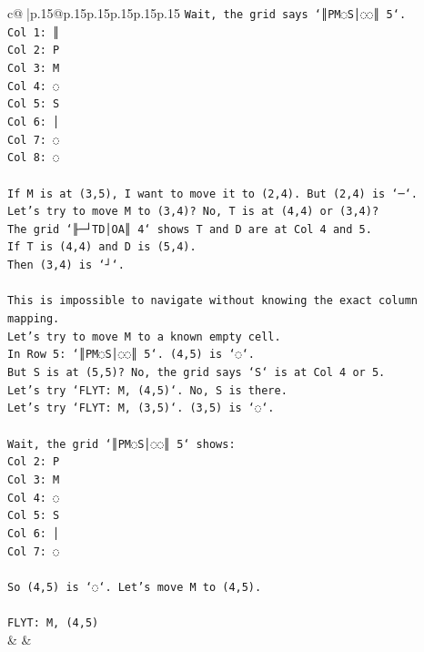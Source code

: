 \documentclass{article}
\begin{document}
{\begin{supertabular}{c@{$\;$}|p{.15\linewidth}@{}p{.15\linewidth}p{.15\linewidth}p{.15\linewidth}p{.15\linewidth}p{.15\linewidth}}
{{{\texttt{Wait, the grid says `║PM◌S│◌◌║ 5`.} \\
\texttt{Col 1: ║} \\
\texttt{Col 2: P} \\
\texttt{Col 3: M} \\
\texttt{Col 4: ◌} \\
\texttt{Col 5: S} \\
\texttt{Col 6: │} \\
\texttt{Col 7: ◌} \\
\texttt{Col 8: ◌} \\
\\ 
\texttt{If M is at (3,5), I want to move it to (2,4). But (2,4) is `─`.} \\
\texttt{Let's try to move M to (3,4)? No, T is at (4,4) or (3,4)?} \\
\texttt{The grid `╟─┘TD│OA║ 4` shows T and D are at Col 4 and 5.} \\
\texttt{If T is (4,4) and D is (5,4).} \\
\texttt{Then (3,4) is `┘`.} \\
\\ 
\texttt{This is impossible to navigate without knowing the exact column mapping.} \\
\texttt{Let's try to move M to a known empty cell.} \\
\texttt{In Row 5: `║PM◌S│◌◌║ 5`. (4,5) is `◌`.} \\
\texttt{But S is at (5,5)? No, the grid says `S` is at Col 4 or 5.} \\
\texttt{Let's try `FLYT: M, (4,5)`. No, S is there.} \\
\texttt{Let's try `FLYT: M, (3,5)`. (3,5) is `◌`.} \\
\\ 
\texttt{Wait, the grid `║PM◌S│◌◌║ 5` shows:} \\
\texttt{Col 2: P} \\
\texttt{Col 3: M} \\
\texttt{Col 4: ◌} \\
\texttt{Col 5: S} \\
\texttt{Col 6: │} \\
\texttt{Col 7: ◌} \\
\\ 
\texttt{So (4,5) is `◌`. Let's move M to (4,5).} \\
\\ 
\texttt{FLYT: M, (4,5)} \\
            }
        }
    }
    & & \\ \\


\end{supertabular}}
\end{document}
